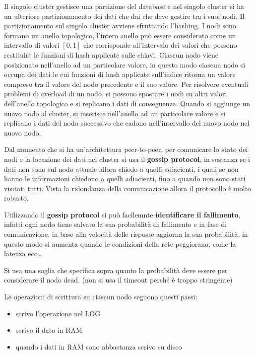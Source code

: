 Il singolo cluster gestisce una partizione del database e nel singolo cluster si 
ha un ulteriore partizionamento dei dati che dai che deve gestire tra i suoi nodi. Il 
partizionamento sul singolo cluster avviene sfruttando l'hashing. I nodi sono 
formano un anello topologico, l'intero anello può essere considerato come un intervallo 
di valori $[0,1]$ che corrisponde all'intervalo dei valori che possono restituire 
le funzioni di hash applicate sulle chiavi. Ciascun nodo viene posizionato nell'anello
ad un particolare valore, in questo modo ciascun nodo si occupa dei dati le cui 
funzioni di hash applicate sull'indice ritorna un valore compreso tra il valore del
nodo precedente e il suo valore. Per risolvere eventuali problemi di overload di 
un nodo, si possono spostare i nodi su altri valori dell'anello topologico e si
replicano i dati di conseguenza. 
Quando si aggiunge un nuovo nodo al cluster, si inserisce nell'anello ad un particolare 
valore e si replicano i dati del nodo successivo che cadono nell'intervallo del 
nuovo nodo nel nuovo nodo.

Dal momento che si ha un'architettura peer-to-peer, per comunicare lo stato 
dei nodi e la locazione dei dati nel cluster si usa il \textbf{gossip protocol},
in sostanza se i dati non sono sul nodo attuale allora chiedo a quelli adiacienti,
i quali se non hanno le informazioni chiedono a quelli adiacienti, fino a quando non 
sono stati visitati tutti. Vista la ridondanza della comunicazione allora 
il protocollo è molto robusto. 

Utilizzando il \textbf{gossip protocol} si può facilemnte \textbf{identificare il fallimento},
infatti ogni nodo tiene salvato la sua probabilità di fallimento e in fase 
di comunicazione, in base alla velocità delle risposte aggiorna la sua probabilità,
in questo modo si aumenta quando le condizioni della rete peggiorano, come la 
latenza ecc\dots

Si usa una soglia che specifica sopra quanto la probabilità deve essere per considerare
il nodo dead. (non si usa il timeout perché è troppo stringente)


Le operazioni di scrittura su ciascun nodo seguono questi passi:
\begin{itemize}
      \item scrivo l'operazione nel LOG
      \item scrivo il dato in RAM
      \item quando i dati in RAM sono abbastanza scrivo su disco
\end{itemize}

